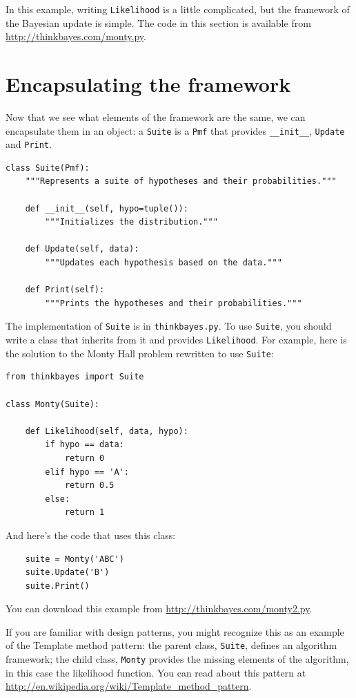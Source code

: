 \documentclass[12pt]{book}
\begin{document}
In this example, writing \verb"Likelihood" is a little complicated,
but the framework of the Bayesian update is simple.  The code in
this section is available from \url{http://thinkbayes.com/monty.py}.


\section{Encapsulating the framework}

Now that we see what elements of the framework are the same, we
can encapsulate them in an object: a \verb"Suite" is a \verb"Pmf"
that provides \verb"__init__", \verb"Update" and \verb"Print".

\begin{verbatim}
class Suite(Pmf):
    """Represents a suite of hypotheses and their probabilities."""

    def __init__(self, hypo=tuple()):
        """Initializes the distribution."""

    def Update(self, data):
        """Updates each hypothesis based on the data."""

    def Print(self):
        """Prints the hypotheses and their probabilities."""
\end{verbatim}

The implementation of \verb"Suite" is in \verb"thinkbayes.py".  To use
\verb"Suite", you should write a class that inherits from it and
provides \verb"Likelihood".  For example, here is the solution to the
Monty Hall problem rewritten to use \verb"Suite":

\begin{verbatim}
from thinkbayes import Suite

class Monty(Suite):

    def Likelihood(self, data, hypo):
        if hypo == data:
            return 0
        elif hypo == 'A':
            return 0.5
        else:
            return 1
\end{verbatim}

And here's the code that uses this class:

\begin{verbatim}
    suite = Monty('ABC')
    suite.Update('B')
    suite.Print()
\end{verbatim}

You can download this example from
\url{http://thinkbayes.com/monty2.py}.

If you are familiar with
design patterns, you might recognize this as an example of the
Template method pattern: the parent class, \verb"Suite", defines an
algorithm framework; the child class, \verb"Monty" provides the
missing elements of the algorithm, in this case the likelihood
function.  You can read about this pattern at
\url{http://en.wikipedia.org/wiki/Template_method_pattern}.
\end{document}
